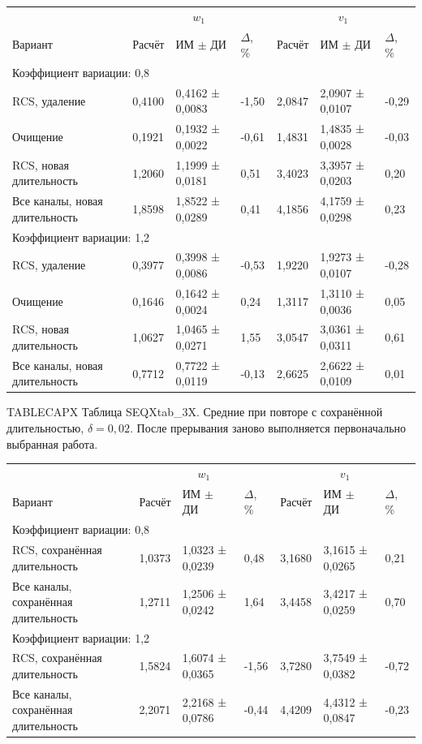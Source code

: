 \setlength{\tabcolsep}{2pt}
\begin{tabular}{p{4.16cm}p{1.61cm}p{2.83cm}p{1.28cm}p{1.61cm}p{2.83cm}p{1.28cm}}
\toprule
 & \multicolumn{3}{c}{$w_1$} & \multicolumn{3}{c}{$v_1$} \\
Вариант & Расчёт & ИМ $\pm$ ДИ & $\Delta$, \% & Расчёт & ИМ $\pm$ ДИ & $\Delta$, \% \\
\midrule
\multicolumn{7}{l}{Коэффициент вариации: 0,8} \\
RCS, удаление & 0,4100 & 0,4162 ± 0,0083 & -1,50 & 2,0847 & 2,0907 ± 0,0107 & -0,29 \\
Очищение & 0,1921 & 0,1932 ± 0,0022 & -0,61 & 1,4831 & 1,4835 ± 0,0028 & -0,03 \\
RCS, новая длительность & 1,2060 & 1,1999 ± 0,0181 & 0,51 & 3,4023 & 3,3957 ± 0,0203 & 0,20 \\
Все каналы, новая длительность & 1,8598 & 1,8522 ± 0,0289 & 0,41 & 4,1856 & 4,1759 ± 0,0298 & 0,23 \\
\multicolumn{7}{l}{Коэффициент вариации: 1,2} \\
RCS, удаление & 0,3977 & 0,3998 ± 0,0086 & -0,53 & 1,9220 & 1,9273 ± 0,0107 & -0,28 \\
Очищение & 0,1646 & 0,1642 ± 0,0024 & 0,24 & 1,3117 & 1,3110 ± 0,0036 & 0,05 \\
RCS, новая длительность & 1,0627 & 1,0465 ± 0,0271 & 1,55 & 3,0547 & 3,0361 ± 0,0311 & 0,61 \\
Все каналы, новая длительность & 0,7712 & 0,7722 ± 0,0119 & -0,13 & 2,6625 & 2,6622 ± 0,0109 & 0,01 \\
\bottomrule
\end{tabular}




\noindent TABLECAPX Таблица SEQXtab_3X. Средние при повторе с сохранённой длительностью, $\delta=0{,}02$. После прерывания заново выполняется первоначально выбранная работа.\par

\setlength{\tabcolsep}{2pt}
\begin{tabular}{p{4.16cm}p{1.61cm}p{2.83cm}p{1.28cm}p{1.61cm}p{2.83cm}p{1.28cm}}
\toprule
 & \multicolumn{3}{c}{$w_1$} & \multicolumn{3}{c}{$v_1$} \\
Вариант & Расчёт & ИМ $\pm$ ДИ & $\Delta$, \% & Расчёт & ИМ $\pm$ ДИ & $\Delta$, \% \\
\midrule
\multicolumn{7}{l}{Коэффициент вариации: 0,8} \\
RCS, сохранённая длительность & 1,0373 & 1,0323 ± 0,0239 & 0,48 & 3,1680 & 3,1615 ± 0,0265 & 0,21 \\
Все каналы, сохранённая длительность & 1,2711 & 1,2506 ± 0,0242 & 1,64 & 3,4458 & 3,4217 ± 0,0259 & 0,70 \\
\multicolumn{7}{l}{Коэффициент вариации: 1,2} \\
RCS, сохранённая длительность & 1,5824 & 1,6074 ± 0,0365 & -1,56 & 3,7280 & 3,7549 ± 0,0382 & -0,72 \\
Все каналы, сохранённая длительность & 2,2071 & 2,2168 ± 0,0786 & -0,44 & 4,4209 & 4,4312 ± 0,0847 & -0,23 \\
\bottomrule
\end{tabular}




